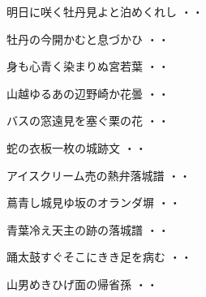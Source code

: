 \vspace{0.6cm}
\begin{shiika}明日に咲く牡丹見よと泊めくれし
\hfill{・・}\end{shiika}
\vspace{0.6cm}
\begin{shiika}牡丹の今開かむと息づかひ
\hfill{・・}\end{shiika}
\vspace{0.6cm}
\begin{shiika}身も心青く染まりぬ宮若葉
\hfill{・・}\end{shiika}
\vspace{0.6cm}
\begin{shiika}山越ゆるあの辺野崎か花曇
\hfill{・・}\end{shiika}
\vspace{0.6cm}
\begin{shiika}バスの窓遠見を塞ぐ栗の花
\hfill{・・}\end{shiika}
\vspace{0.6cm}
\begin{shiika}蛇の衣板一枚の城跡文
\hfill{・・}\end{shiika}
\vspace{0.6cm}
\begin{shiika}アイスクリーム売の熱弁落城譜
\hfill{・・}\end{shiika}
\vspace{0.6cm}
\begin{shiika}蔦青し城見ゆ坂のオランダ塀
\hfill{・・}\end{shiika}
\vspace{0.6cm}
\begin{shiika}青葉冷え天主の跡の落城譜
\hfill{・・}\end{shiika}
\vspace{0.6cm}
\begin{shiika}踊太鼓すぐそこにきき足を病む
\hfill{・・}\end{shiika}
\vspace{0.6cm}
\begin{shiika}山男めきひげ面の帰省孫
\hfill{・・}\end{shiika}
